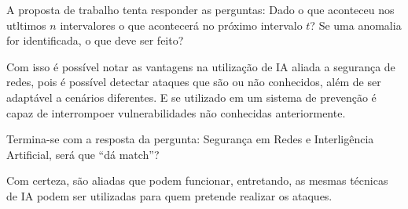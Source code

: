 \documentclass[12pt]{article}
\begin{document}
A proposta de trabalho tenta responder as perguntas: Dado o que aconteceu nos utltimos $n$ intervalores o que acontecerá no próximo intervalo $t$? Se uma anomalia for identificada, o que deve ser feito?

Com isso é possível notar as vantagens na utilização de IA aliada a segurança de redes, pois é possível detectar ataques que são ou não conhecidos, além de ser adaptável a cenários diferentes. E se utilizado em um sistema de prevenção é capaz de interrompoer vulnerabilidades não conhecidas anteriormente.

Termina-se com a resposta da pergunta: Segurança em Redes e Interligência Artificial, será que ``dá match''?

Com certeza, são aliadas que podem funcionar, entretando, as mesmas técnicas de IA podem ser utilizadas para quem pretende realizar os ataques.
\end{document}
